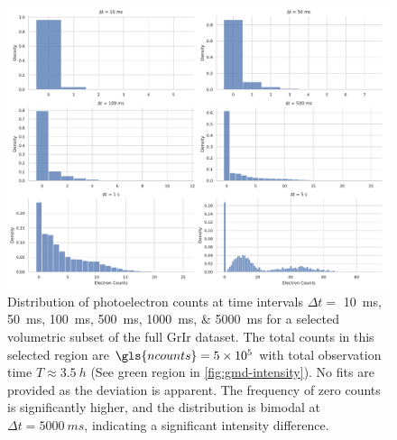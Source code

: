 \begin{figure}
    \centering
    \includegraphics[width=1\linewidth]{images/hist_counts_facetgrid_2_grir.pdf}
    \caption{Distribution of photoelectron counts at time intervals $\Delta t =$ \qtylist{10;50;100;500;1000;5000}{ms} for a selected volumetric subset of the full \gls{GrIr} dataset. The total counts in this selected region are $\gls{ncounts}=\num{5e5}$ with total observation time $T\approx\qty{3.5}{h}$  (See green region in \cref{fig:gmd-intensity}). No fits are provided as the deviation is apparent. The frequency of zero counts is significantly higher, and the distribution is bimodal at $\Delta t = \qty{5000}{ms}$, indicating a significant intensity difference.}
    \label{fig:grir-stats-2}
\end{figure}




